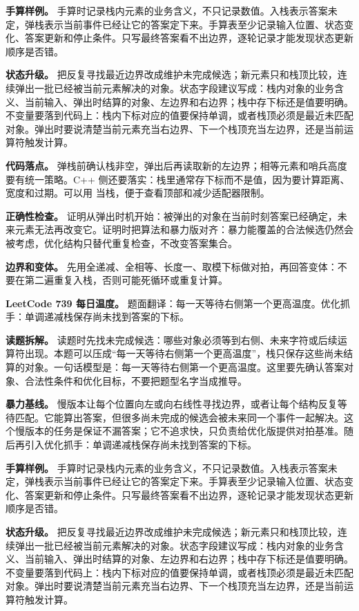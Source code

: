 \textbf{手算样例。} 手算时记录栈内元素的业务含义，不只记录数值。入栈表示答案未定，弹栈表示当前事件已经让它的答案定下来。手算表至少记录输入位置、状态变化、答案更新和停止条件。只写最终答案看不出边界，逐轮记录才能发现状态更新顺序是否错。

\textbf{状态升级。} 把反复寻找最近边界改成维护未完成候选；新元素只和栈顶比较，连续弹出一批已经被当前元素解决的对象。状态字段建议写成：栈内对象的业务含义、当前输入、弹出时结算的对象、左边界和右边界；栈中存下标还是值要明确。不变量要落到代码上：栈内下标对应的值要保持单调，或者栈顶必须是最近未匹配对象。弹出时要说清楚当前元素充当右边界、下一个栈顶充当左边界，还是当前运算符触发计算。

\textbf{代码落点。} 弹栈前确认栈非空，弹出后再读取新的左边界；相等元素和哨兵高度要有统一策略。C++ 侧还要落实：栈里通常存下标而不是值，因为要计算距离、宽度和过期。可以用  当栈，便于查看顶部和减少适配器限制。

\textbf{正确性检查。} 证明从弹出时机开始：被弹出的对象在当前时刻答案已经确定，未来元素无法再改变它。证明时把算法和暴力版对齐：暴力能覆盖的合法候选仍然会被考虑，优化结构只替代重复检查，不改变答案集合。

\textbf{边界和变体。} 先用全递减、全相等、长度一、取模下标做对拍，再回答变体：不要在第二遍重复入栈，否则可能死循环或重复计算。

\noindent\textbf{LeetCode 739 每日温度。} 题面翻译：每一天等待右侧第一个更高温度。优化抓手：单调递减栈保存尚未找到答案的下标。

\textbf{读题拆解。} 读题时先找未完成候选：哪些对象必须等到右侧、未来字符或后续运算符出现。本题可以压成“每一天等待右侧第一个更高温度”，栈只保存这些尚未结算的对象。一句话模型是：每一天等待右侧第一个更高温度。这里要先确认答案对象、合法性条件和优化目标，不要把题型名字当成推导。

\textbf{暴力基线。} 慢版本让每个位置向左或向右线性寻找边界，或者让每个结构反复等待匹配。它能算出答案，但很多尚未完成的候选会被未来同一个事件一起解决。这个慢版本的任务是保证不漏答案；它不追求快，只负责给优化版提供对拍基准。随后再引入优化抓手：单调递减栈保存尚未找到答案的下标。

\textbf{手算样例。} 手算时记录栈内元素的业务含义，不只记录数值。入栈表示答案未定，弹栈表示当前事件已经让它的答案定下来。手算表至少记录输入位置、状态变化、答案更新和停止条件。只写最终答案看不出边界，逐轮记录才能发现状态更新顺序是否错。

\textbf{状态升级。} 把反复寻找最近边界改成维护未完成候选；新元素只和栈顶比较，连续弹出一批已经被当前元素解决的对象。状态字段建议写成：栈内对象的业务含义、当前输入、弹出时结算的对象、左边界和右边界；栈中存下标还是值要明确。不变量要落到代码上：栈内下标对应的值要保持单调，或者栈顶必须是最近未匹配对象。弹出时要说清楚当前元素充当右边界、下一个栈顶充当左边界，还是当前运算符触发计算。

